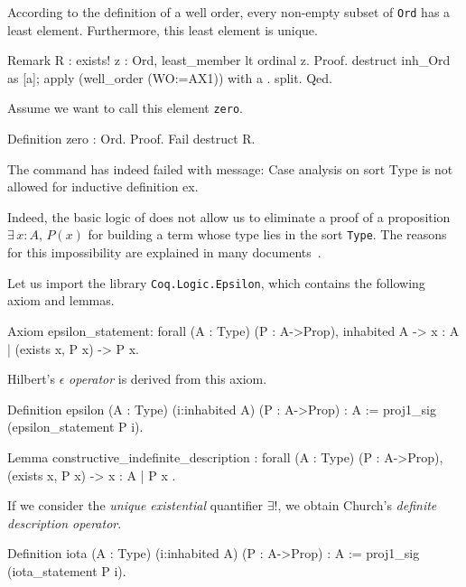 According to the  definition of a well order, every non-empty subset of \texttt{Ord} has a least element. Furthermore, this least element is unique.


\begin{Coqsrc}
Remark R : exists! z : Ord, least_member lt  ordinal z.
Proof.
  destruct inh_Ord as [a]; apply (well_order (WO:=AX1)) with a .
  split.
Qed.
\end{Coqsrc}

Assume we want to call this element  \texttt{zero}.



\begin{Coqsrc}
Definition zero : Ord.
Proof.
  Fail destruct R.
\end{Coqsrc}

\begin{Coqanswer}
The command has indeed failed with message:
Case analysis on sort Type is not allowed for inductive 
definition ex.
\end{Coqanswer}


Indeed, the basic logic of  \coq{} does not allow us to eliminate a proof of a proposition 
$\exists\,x:A,\,P(x)$ for building a term whose type lies in the sort \texttt{Type}. 
The reasons for this impossibility are explained in many documents~\cite{BC04, chlipalacpdt2011, Coq}.

Let us import the library \texttt{Coq.Logic.Epsilon}, which contains the following axiom and lemmas.


\begin{Coqsrc}
Axiom epsilon_statement:
  forall (A : Type) (P : A->Prop), inhabited A ->
    {x : A | (exists x, P x) -> P x}.
\end{Coqsrc}

Hilbert's $\epsilon$ \emph{operator} is derived from this  axiom.

\begin{Coqsrc}
Definition epsilon (A : Type) (i:inhabited A) (P : A->Prop) : A
  := proj1_sig (epsilon_statement P i).

Lemma constructive_indefinite_description :
  forall (A : Type) (P : A->Prop),
    (exists x, P x) -> { x : A | P x }.
\end{Coqsrc}




If we consider the \emph{unique existential} quantifier $\exists!$, we obtain
Church's \emph{definite description operator}.

\begin{Coqsrc}
Definition iota (A : Type) (i:inhabited A) (P : A->Prop) : A
  := proj1_sig (iota_statement P i).
\end{Coqsrc}


